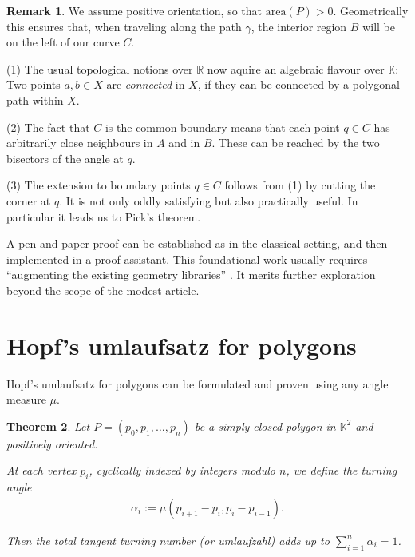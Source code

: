 \documentclass[a4paper]{amsart}
\numberwithin{equation}{section}
\theoremstyle{plain}
\newtheorem{theorem}{Theorem}[section]
\theoremstyle{definition}
\newtheorem{remark}[theorem]{Remark}
\newcommand{\R}{\mathbb{R}}
\newcommand{\K}{\mathbb{K}}
\newcommand{\ee}[2]{\mathopen] #1, #2 \mathclose[}
\newcommand{\area}{\mathrm{area}}
\begin{document}
\begin{remark}
  We assume positive orientation, so that $\area(P) > 0$.
  Geometrically this ensures that, when traveling along the path $\gamma$,
  the interior region $B$ will be on the left of our curve $C$.
  
  (1) The usual topological notions over $\R$
  now aquire an algebraic flavour over $\K$:
  Two points $a,b \in X$ are \emph{connected} in $X$,
  if they can be connected by a polygonal path within $X$.
  
  (2) The fact that $C$ is the common boundary means that
  each point $q \in C$ has arbitrarily close neighbours in $A$ and in $B$.
  These can be reached by the two bisectors of the angle at $q$.

  (3) The extension to boundary points $q \in C$ %
  follows from (1) by cutting the corner at $q$. %
  It is not only oddly satisfying but also practically useful.
  In particular it leads us to Pick's theorem. %
\end{remark}

A pen-and-paper proof %
can be established as in the classical setting,
and then implemented in a proof assistant. %
This foundational work usually requires
``augmenting the existing geometry libraries'' \cite{Binder:Kosaian:2024}.
It merits further exploration beyond the scope of the modest article.


\setcounter{section}{7}
\section{Hopf's umlaufsatz for polygons}

Hopf's umlaufsatz for polygons can be formulated
and proven using any angle measure $\mu$.

\begin{theorem}
  Let $P = (p_0,p_1,\ldots,p_n)$ be a simply closed
  polygon in $\K^2$ and positively oriented.
  
  At each vertex $p_i$, cyclically indexed
  by integers modulo $n$, we define the turning angle
  \begin{align*}
    \alpha_i := \mu(p_{i+1}-p_i, p_i-p_{i-1}) .
  \end{align*}

  Then the total tangent turning number (or umlaufzahl)
  adds up to $\sum_{i=1}^n \alpha_i = 1$.
\end{theorem}
\end{document}
